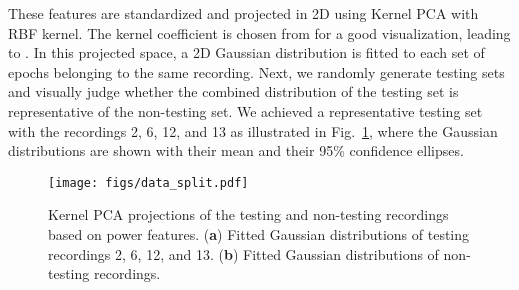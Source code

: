 \documentclass[conference]{IEEEtran}
\begin{document}
These features are standardized and projected in 2D using Kernel PCA \cite{scholkopf1997kernel} with RBF kernel. The kernel coefficient  is chosen from  for a good visualization, leading to . In this projected space, a 2D Gaussian distribution is fitted to each set of epochs belonging to the same recording. Next, we randomly generate testing sets and visually judge whether the combined distribution of the testing set is representative of the non-testing set. We achieved a representative testing set with the recordings 2, 6, 12, and 13 as illustrated in Fig.~\ref{fig:data_split}, where the Gaussian distributions are shown with their mean and their 95\% confidence ellipses.

\begin{figure}[tbp]
\centering \texttt{[image: figs/data\_split.pdf]}
  \caption{Kernel PCA projections of the testing and non-testing recordings based on power features. (\textbf{a}) Fitted Gaussian distributions of testing recordings 2, 6, 12, and 13. (\textbf{b}) Fitted Gaussian distributions of non-testing recordings.}
  \label{fig:data_split}
\end{figure}









\end{document}
